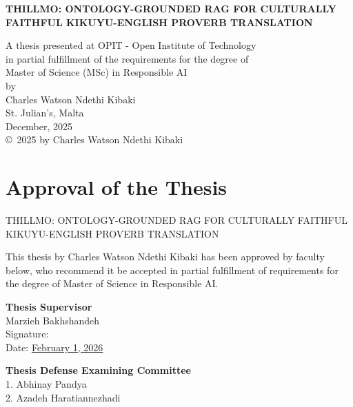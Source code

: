 \documentclass[12pt]{report}
\begin{document}
\begin{titlepage}
\centering
{\Large\bfseries THILLMO: ONTOLOGY-GROUNDED RAG FOR CULTURALLY FAITHFUL KIKUYU-ENGLISH PROVERB TRANSLATION \par}
\vfill
A thesis presented at OPIT - Open Institute of Technology\\
in partial fulfillment of the requirements for the degree of\\
Master of Science (MSc) in Responsible AI\\
\vfill
by\\
Charles Watson Ndethi Kibaki\\
\vfill
St. Julian's, Malta\\
December, 2025\\
\vfill
\copyright~2025 by Charles Watson Ndethi Kibaki
\end{titlepage}


\chapter*{Approval of the Thesis}
\begin{center}
    {\Large THILLMO: ONTOLOGY-GROUNDED RAG FOR CULTURALLY FAITHFUL KIKUYU-ENGLISH PROVERB TRANSLATION}
\end{center}
\vspace{1cm}

This thesis by Charles Watson Ndethi Kibaki has been approved by faculty below, who recommend it be accepted in partial fulfillment of requirements for the degree of Master of Science in Responsible AI.

\vspace{1cm}
\textbf{Thesis Supervisor} \\
Marzieh Bakhshandeh \\
Signature: \underline{\hspace{5cm}} \\
Date: \underline{February 1, 2026}

\vspace{1cm}
\textbf{Thesis Defense Examining Committee} \\
1. Abhinay Pandya \\
2. Azadeh Haratiannezhadi
\end{document}
